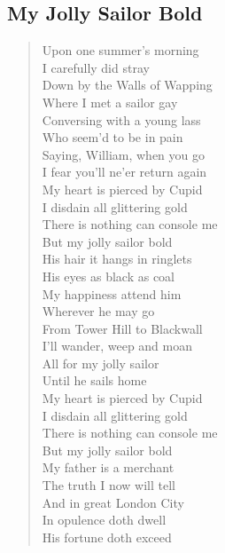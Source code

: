 \documentclass[11pt]{article}
\begin{document}
\subsection{My Jolly Sailor Bold}
\label{sec:org42deb86}
\begin{verse}
Upon one summer's morning\\
I carefully did stray\\
Down by the Walls of Wapping\\
Where I met a sailor gay\\
\vspace*{1em}
Conversing with a young lass\\
Who seem'd to be in pain\\
Saying, William, when you go\\
I fear you'll ne'er return again\\
\vspace*{1em}
My heart is pierced by Cupid\\
I disdain all glittering gold\\
There is nothing can console me\\
But my jolly sailor bold\\
\vspace*{1em}
His hair it hangs in ringlets\\
His eyes as black as coal\\
My happiness attend him\\
Wherever he may go\\
\vspace*{1em}
From Tower Hill to Blackwall\\
I'll wander, weep and moan\\
All for my jolly sailor\\
Until he sails home\\
\vspace*{1em}
My heart is pierced by Cupid\\
I disdain all glittering gold\\
There is nothing can console me\\
But my jolly sailor bold\\
\vspace*{1em}
My father is a merchant\\
The truth I now will tell\\
And in great London City\\
In opulence doth dwell\\
\vspace*{1em}
His fortune doth exceed\\

\end{verse}
\end{document}
